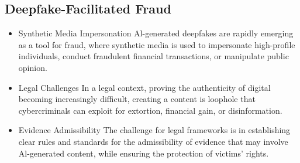 \subsection{Deepfake-Facilitated Fraud}
\begin{itemize}
  \item Synthetic Media Impersonation Al-generated deepfakes are rapidly
    emerging as a tool for fraud, where synthetic media is used to impersonate
    high-profile individuals, conduct fraudulent financial transactions, or
    manipulate public opinion.
  \item Legal Challenges In a legal context, proving the authenticity of
    digital becoming increasingly difficult, creating a content is loophole
    that cybercriminals can exploit for extortion, financial gain, or
    disinformation.
  \item Evidence Admissibility The challenge for legal frameworks is in
    establishing clear rules and standards for the admissibility of evidence
    that may involve Al-generated content, while ensuring the protection of
    victims' rights.
\end{itemize}
